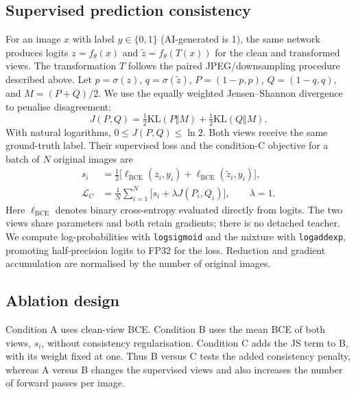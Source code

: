 
\subsection{Supervised prediction consistency}
\label{sec:wang-consistency}
For an image $x$ with label $y\in\{0,1\}$ (AI-generated is 1), the same
network produces logits $z=f_\theta(x)$ and $\tilde z=f_\theta(T(x))$ for
the clean and transformed views. The transformation $T$ follows the paired
JPEG/downsampling procedure described above. Let $p=\sigma(z)$,
$q=\sigma(\tilde z)$, $P=(1-p,p)$, $Q=(1-q,q)$, and $M=(P+Q)/2$.
We use the equally weighted Jensen--Shannon divergence~\cite{wang_lin1991}
to penalise disagreement:
\begin{equation}
\label{eq:wang-js}
 J(P,Q)=\tfrac12\mathrm{KL}(P\Vert M)
       +\tfrac12\mathrm{KL}(Q\Vert M).
\end{equation}
With natural logarithms, $0\leq J(P,Q)\leq\ln 2$. Both views receive the
same ground-truth label. Their supervised loss and the condition-C objective
for a batch of $N$ original images are
\begin{align}
 s_i &= \tfrac12\bigl[\ell_{\mathrm{BCE}}(z_i,y_i)
                  +\ell_{\mathrm{BCE}}(\tilde z_i,y_i)\bigr],
 \label{eq:wang-supervised}\\
 \mathcal{L}_{C} &= \frac{1}{N}\sum_{i=1}^{N}
             \bigl[s_i+\lambda J(P_i,Q_i)\bigr],\qquad\lambda=1.
 \label{eq:wang-objective}
\end{align}
Here $\ell_{\mathrm{BCE}}$ denotes binary cross-entropy evaluated directly
from logits. The two views share parameters and both retain gradients;
there is no detached teacher. We compute log-probabilities with
\texttt{logsigmoid} and the mixture with \texttt{logaddexp}, promoting
half-precision logits to FP32 for the loss. Reduction and gradient
accumulation are normalised by the number of original images.

\subsection{Ablation design}
\label{sec:wang-ablation-design}
Condition A uses clean-view BCE. Condition B uses the mean BCE of both
views, $s_i$, without consistency regularisation. Condition C adds the JS
term to B, with its weight fixed at one. Thus B versus C tests the added
consistency penalty, whereas A versus B changes the supervised views and
also increases the number of forward passes per image.

